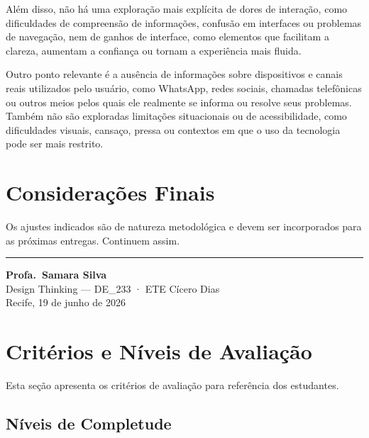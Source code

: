 \documentclass[
  sigconf,
  nonacm, %
  language=portuguese
]{acmart}
\begin{document}
Além disso, não há uma exploração mais explícita de dores de interação, como dificuldades de compreensão de informações, confusão em interfaces ou problemas de navegação, nem de ganhos de interface, como elementos que facilitam a clareza, aumentam a confiança ou tornam a experiência mais fluida.

Outro ponto relevante é a ausência de informações sobre dispositivos e canais reais utilizados pelo usuário, como WhatsApp, redes sociais, chamadas telefônicas ou outros meios pelos quais ele realmente se informa ou resolve seus problemas. Também não são exploradas limitações situacionais ou de acessibilidade, como dificuldades visuais, cansaço, pressa ou contextos em que o uso da tecnologia pode ser mais restrito.

\section{Considerações Finais}

Os ajustes indicados são de natureza metodológica e devem ser
incorporados para as próximas entregas.
Continuem assim.


\vspace{1.5em}
\noindent\rule{\linewidth}{0.4pt}

\begin{flushright}
\textbf{Profa.\ Samara Silva}\\
{\small\color{cmuted} Design Thinking --- DE\_233 · ETE Cícero Dias}\\
{\small\color{cmuted} Recife, 19 de junho de 2026}
\end{flushright}


\appendix
\onecolumn
\section{Critérios e Níveis de Avaliação}

Esta seção apresenta os critérios de avaliação para referência dos estudantes.

\subsection{Níveis de Completude}
\end{document}
